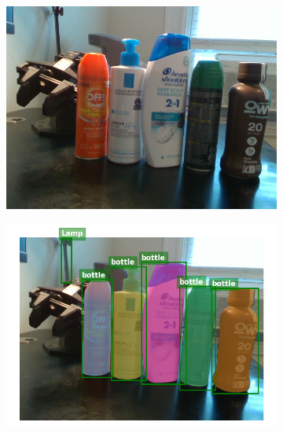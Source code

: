 \documentclass{article}
\begin{document}
\begin{figure}[]
    \begin{subfigure}{(\linewidth - 0.05\linewidth)/5}
        \centering
        \includegraphics[width=\linewidth]{figures/real2sim2real/4/1.png}
    \end{subfigure}
    \begin{subfigure}{(\linewidth - 0.05\linewidth)/5}
        \centering
        \includegraphics[width=\linewidth]{figures/real2sim2real/4/0.png}
    \end{subfigure}
    \begin{subfigure}{(\linewidth - 0.05\linewidth)/5}
        \centering

\end{subfigure}
\end{figure}
\end{document}
